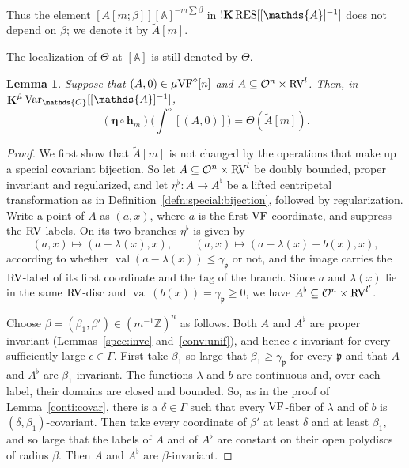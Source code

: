 \documentclass[12pt]{amsart}
\theoremstyle{plain}
\newtheorem{lem}[thm]{Lemma}
\theoremstyle{definition}
\theoremstyle{remark}
\numberwithin{equation}{section}
\theoremstyle{plain}
\newcommand{\VF}{\textup{VF}}
\newcommand{\RV}{\textup{RV}}
\newcommand{\OO}{\mdl O}
\newcommand{\Z}{\mathds{Z}}
\newcommand{\A}{\mathds{A}}
\newcommand{\C}{\mathds{C}}
\newcommand{\gp}{\mathfrak{p}}
\newcommand{\0}{\emptyset}
\newcommand{\mdl}[1]{\mathcal{#1}}  %
\newcommand{\fun}{\longrightarrow}
\newcommand{\efun}{\longmapsto}
\newcommand{\sub}{\subseteq}
\newcommand{\mgVF}{{\mu} {\VF}}
\newcommand{\RES}{\textup{RES}}
\DeclareMathOperator{\vv}{val}
\DeclareMathOperator{\ggk}{\mathbf{K}}
\DeclareMathOperator{\sggk}{!\mathbf{K}}
\newcommand{\var}{\textup{Var}}
\newcommand{\gmv}{\ggk^{\hat \mu}\var_{\C}}
\begin{document}
Thus the element $[A[m;\beta]][\A]^{- m\sum \beta }$ in $\sggk \RES[[\A]^{-1}]$ does not depend on $\beta$; we denote it by $\tilde A[m]$.

The localization of $\Theta$ at $[\A]$ is still denoted by $\Theta$.

\begin{lem}\label{inv:dir:com}
Suppose that $(A, 0) \in \mgVF^\diamond[n]$ and $A \sub \OO^n \times \RV^l$. Then, in $\gmv[[\A]^{-1}]$,
\[
(\bm \eta \circ \bm h_m) \Big( \int^\diamond [(A, 0)] \Big) = \Theta(\tilde A[m]).
\]
\end{lem}
\begin{proof}
We first show that $\tilde A[m]$ is not changed by the operations that make up a special covariant bijection. So let $A \sub \OO^n \times \RV^l$ be doubly bounded, proper invariant and regularized, and let $\eta^\flat : A \fun A^\flat$ be a lifted centripetal transformation as in Definition~\ref{defn:special:bijection}, followed by regularization. Write a point of $A$ as $(a, x)$, where $a$ is the first $\VF$-coordinate, and suppress the $\RV$-labels. On its two branches $\eta^\flat$ is given by
\[
(a, x) \efun (a - \lambda(x), x), \qquad (a, x) \efun (a - \lambda(x) + b(x), x),
\]
according to whether $\vv(a - \lambda(x)) \leq \gamma_\gp$ or not, and the image carries the $\RV$-label of its first coordinate and the tag of the branch. Since $a$ and $\lambda(x)$ lie in the same $\RV$-disc and $\vv(b(x)) = \gamma_\gp \geq 0$, we have $A^\flat \sub \OO^n \times \RV^{l'}$.

Choose $\beta = (\beta_1, \beta') \in (m^{-1}\Z)^n$ as follows. Both $A$ and $A^\flat$ are proper invariant (Lemmas~\ref{spec:inve} and~\ref{conv:unif}), and hence $\epsilon$-invariant for every sufficiently large $\epsilon \in \Gamma$. First take $\beta_1$ so large that $\beta_1 \geq \gamma_\gp$ for every $\gp$ and that $A$ and $A^\flat$ are $\beta_1$-invariant. The functions $\lambda$ and $b$ are continuous and, over each label, their domains are closed and bounded. So, as in the proof of Lemma~\ref{conti:covar}, there is a $\delta \in \Gamma$ such that every $\VF$-fiber of $\lambda$ and of $b$ is $(\delta, \beta_1)$-covariant. Then take every coordinate of $\beta'$ at least $\delta$ and at least $\beta_1$, and so large that the labels of $A$ and of $A^\flat$ are constant on their open polydiscs of radius $\beta$. Then $A$ and $A^\flat$ are $\beta$-invariant.


\end{proof}
\end{document}
